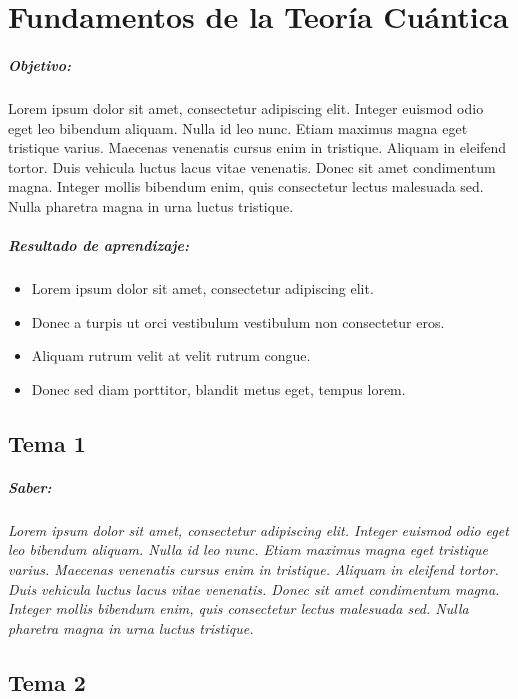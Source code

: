 \chapter{Fundamentos de la Teoría Cuántica}
\paragraph{Objetivo:}
Lorem ipsum dolor sit amet, consectetur adipiscing elit. Integer euismod odio eget leo bibendum aliquam. Nulla id leo nunc. Etiam maximus magna eget tristique varius. Maecenas venenatis cursus enim in tristique. Aliquam in eleifend tortor. Duis vehicula luctus lacus vitae venenatis. Donec sit amet condimentum magna. Integer mollis bibendum enim, quis consectetur lectus malesuada sed. Nulla pharetra magna in urna luctus tristique.

\paragraph{Resultado de aprendizaje: }

\begin{itemize}
	\item Lorem ipsum dolor sit amet, consectetur adipiscing elit.
	\item Donec a turpis ut orci vestibulum vestibulum non consectetur eros.
	\item Aliquam rutrum velit at velit rutrum congue.
	\item Donec sed diam porttitor, blandit metus eget, tempus lorem.
\end{itemize}


\section{Tema 1}
\paragraph{Saber: }
\textit{
Lorem ipsum dolor sit amet, consectetur adipiscing elit. Integer euismod odio eget leo bibendum aliquam. Nulla id leo nunc. Etiam maximus magna eget tristique varius. Maecenas venenatis cursus enim in tristique. Aliquam in eleifend tortor. Duis vehicula luctus lacus vitae venenatis. Donec sit amet condimentum magna. Integer mollis bibendum enim, quis consectetur lectus malesuada sed. Nulla pharetra magna in urna luctus tristique.
}

\section{Tema 2}
